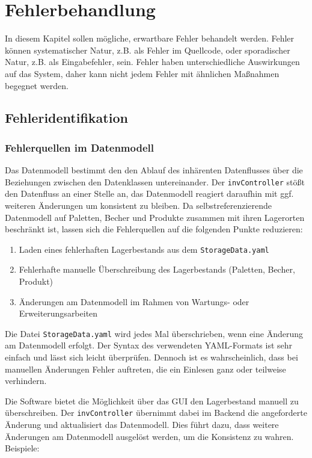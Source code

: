﻿\chapter{Fehlerbehandlung}\label{Fehlerbehandlung}

In diesem Kapitel sollen mögliche, erwartbare Fehler behandelt werden. 
Fehler können systematischer Natur, z.B. als Fehler im Quellcode, oder sporadischer Natur, z.B. als Eingabefehler, sein.
Fehler haben unterschiedliche Auswirkungen auf das System, daher kann nicht jedem Fehler mit ähnlichen Maßnahmen begegnet werden.

\section{Fehleridentifikation}

\subsection{Fehlerquellen im Datenmodell}

Das Datenmodell bestimmt den den Ablauf des inhärenten Datenflusses über die Beziehungen zwischen den Datenklassen untereinander.
Der \verb|invController| stößt den Datenfluss an einer Stelle an, das Datenmodell reagiert daraufhin mit ggf. weiteren Änderungen um 
konsistent zu bleiben. 
Da selbstreferenzierende Datenmodell auf Paletten, Becher und Produkte zusammen mit ihren Lagerorten beschränkt ist,
lassen sich die Fehlerquellen auf die folgenden Punkte reduzieren:
\begin{enumerate}
    \item Laden eines fehlerhaften Lagerbestands aus dem \verb|StorageData.yaml|
    \item Fehlerhafte manuelle Überschreibung des Lagerbestands (Paletten, Becher, Produkt)
    \item Änderungen am Datenmodell im Rahmen von Wartungs- oder Erweiterungsarbeiten
\end{enumerate} 

Die Datei \verb|StorageData.yaml| wird jedes Mal überschrieben, wenn eine Änderung am Datenmodell erfolgt.
Der Syntax des verwendeten YAML-Formats ist sehr einfach und lässt sich leicht überprüfen. 
Dennoch ist es wahrscheinlich, dass bei manuellen Änderungen Fehler auftreten, die ein Einlesen ganz oder teilweise verhindern.

Die Software bietet die Möglichkeit über das GUI den Lagerbestand manuell zu überschreiben. 
Der \verb|invController| übernimmt dabei im Backend die angeforderte Änderung und aktualisiert das Datenmodell.
Dies führt dazu, dass weitere Änderungen am Datenmodell ausgelöst werden, um die Konsistenz zu wahren.\\
Beispiele:\\

